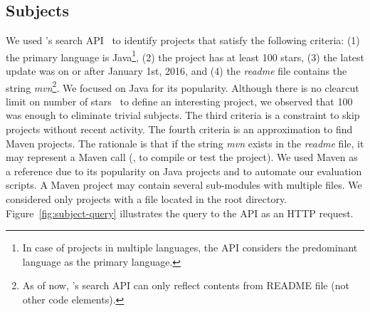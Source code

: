 

\subsection{Subjects}
\label{sec:subjects}



We used \github{}'s search API~\cite{githubsearch} to identify
projects that satisfy the following criteria: (1) the primary language
is Java\footnote{In case of projects in multiple languages, the
  \github{} API considers the predominant language as the primary
  language.}, (2) the project has at least 100 stars, (3) the latest
update was on or after January 1st, 2016, and (4) the \emph{readme}
file contains the string \emph{mvn}\footnote{As of now, \github{}'s
  search API can only reflect contents from README file (not other
  code elements).}.  We focused on Java for its popularity.  Although
there is no clearcut limit on number of \github{}
stars~\cite{github-stars} to define an interesting project, we
observed that 100 was enough to eliminate trivial subjects. The third
criteria is a constraint to skip projects without recent activity. The
fourth criteria is an approximation to find Maven projects. The
rationale is that if the string \emph{mvn} exists in the \emph{readme}
file, it may represent a Maven call (\eg, to compile or test the
project). We used Maven as a reference due to its popularity on Java
projects and to automate our evaluation scripts. A Maven project may
contain several sub-modules with multiple \pomf{} files. We considered
only projects with a \pomf{} file located in the root directory.
Figure~\ref{fig:subject-query} illustrates the query to the \github{}
API as an HTTP request.

